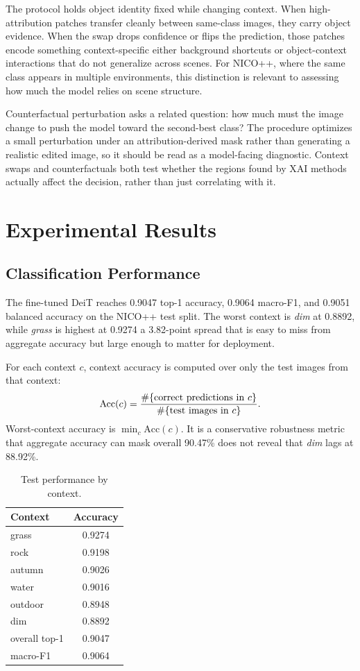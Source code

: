 \documentclass[10pt]{article}
\begin{document}
The protocol holds object identity fixed while changing context. When high-attribution patches transfer cleanly between same-class images, they carry object evidence. When the swap drops confidence or flips the prediction, those patches encode something context-specific either background shortcuts or object-context interactions that do not generalize across scenes. For NICO++, where the same class appears in multiple environments, this distinction is relevant to assessing how much the model relies on scene structure.

Counterfactual perturbation asks a related question: how much must the image change to push the model toward the second-best class? The procedure optimizes a small perturbation under an attribution-derived mask rather than generating a realistic edited image, so it should be read as a model-facing diagnostic. Context swaps and counterfactuals both test whether the regions found by XAI methods actually affect the decision, rather than just correlating with it.

\section{Experimental Results}
\subsection{Classification Performance}
The fine-tuned DeiT reaches 0.9047 top-1 accuracy, 0.9064 macro-F1, and 0.9051 balanced accuracy on the NICO++ test split. The worst context is \emph{dim} at 0.8892, while \emph{grass} is highest at 0.9274 a 3.82-point spread that is easy to miss from aggregate accuracy but large enough to matter for deployment.

For each context $c$, context accuracy is computed over only the test images from that context:
\[
\mathrm{Acc}(c)={\#\{\mathrm{correct\ predictions\ in\ }c\}\over \#\{\mathrm{test\ images\ in\ }c\}}.
\]
Worst-context accuracy is $\min_c \mathrm{Acc}(c)$. It is a conservative robustness metric that aggregate accuracy can mask overall 90.47\% does not reveal that \emph{dim} lags at 88.92\%.

\begin{table}[H]
\centering
\caption{Test performance by context.}
\label{tab:context}
\begin{tabular}{lc}
\toprule
Context & Accuracy\\
\midrule
grass & 0.9274\\
rock & 0.9198\\
autumn & 0.9026\\
water & 0.9016\\
outdoor & 0.8948\\
dim & 0.8892\\
\midrule
overall top-1 & 0.9047\\
macro-F1 & 0.9064\\
\bottomrule
\end{tabular}
\end{table}
\end{document}
